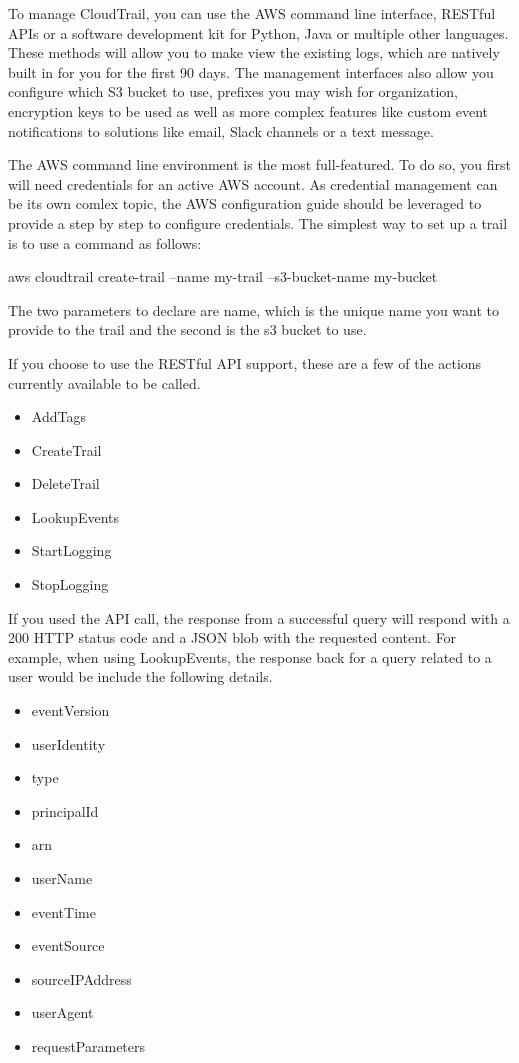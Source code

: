 To manage CloudTrail, you can use the AWS command line interface, RESTful APIs
or a software development kit for Python, Java or multiple other languages. 
These methods will allow you to make view the existing logs, which are natively 
built in for you for the first 90 days. The management interfaces also allow
you configure which S3 bucket to use, prefixes you may wish for organization, 
encryption keys to be used as well as more complex features like custom event
notifications to solutions like email, Slack channels or a text message.

The AWS command line environment is the most full-featured. To do so, you first 
will need credentials for an active AWS account. As credential management can 
be its own comlex topic,  the AWS configuration guide should be leveraged to 
provide a step by step to configure credentials. The simplest way to set up a 
trail is to use a command as follows: 

aws cloudtrail create-trail --name my-trail --s3-bucket-name my-bucket

The two parameters to declare are name, which is the unique name you want to 
provide to the trail and the second is the s3 bucket to use.

If you choose to use the RESTful API support, these are a few of
the actions currently available to be called.

\begin{itemize}
\item AddTags
\item CreateTrail
\item DeleteTrail
\item LookupEvents
\item StartLogging
\item StopLogging
\end{itemize}

If you used the API call, the response from a successful query will respond with 
a 200 HTTP status code and a JSON blob with the requested content. For example,
when using LookupEvents, the response back for a query related to a user would be 
include the following details.

\begin{itemize}
\item eventVersion
\item userIdentity
\item type
\item principalId
\item arn
\item userName
\item eventTime
\item eventSource
\item sourceIPAddress
\item userAgent
\item requestParameters
\end{itemize}

